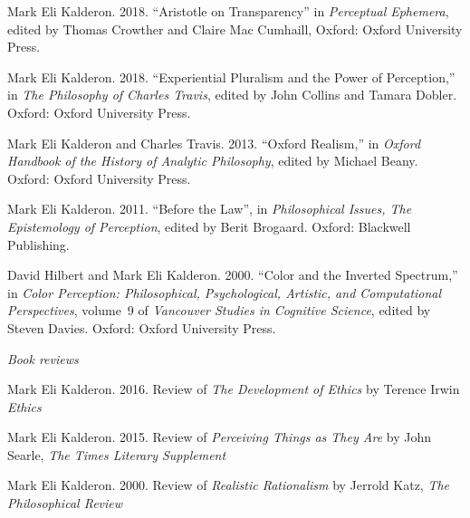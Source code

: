 \documentclass[11pt]{article}
\begin{document}
\ind Mark Eli Kalderon. 2018. ``Aristotle on Transparency'' in \emph{Perceptual Ephemera}, edited by Thomas Crowther and Claire Mac Cumhaill, Oxford: Oxford University Press. 

\ind Mark Eli Kalderon. 2018. ``Experiential Pluralism and the Power of Perception,'' in \emph{The Philosophy of Charles Travis}, edited by John Collins and Tamara Dobler. Oxford: Oxford University Press. 

\ind Mark Eli Kalderon and Charles Travis. 2013. ``Oxford Realism,''  in \emph{Oxford Handbook of the History of Analytic Philosophy}, edited by Michael Beany. Oxford: Oxford University Press.

\ind Mark Eli Kalderon. 2011. ``Before the Law'', in \emph{Philosophical Issues, The Epistemology of Perception}, edited by Berit Brogaard. Oxford: Blackwell Publishing.

\ind David Hilbert and Mark Eli Kalderon. 2000. ``Color and the Inverted Spectrum,'' in \emph{Color Perception: Philosophical, Psychological, Artistic, and Computational Perspectives}, volume~9 of \emph{Vancouver Studies in Cognitive Science}, edited by Steven Davies. Oxford: Oxford University Press.



\bigskip


\noindent\emph{Book reviews \vspace{0.05in}}

\ind Mark Eli Kalderon. 2016. Review of \emph{The Development of Ethics} by Terence Irwin \emph{Ethics}

\ind Mark Eli Kalderon. 2015. Review of \emph{Perceiving Things as They Are} by John Searle, \emph{The Times Literary Supplement}

\ind Mark Eli Kalderon. 2000. Review of \emph{Realistic Rationalism} by Jerrold Katz, \emph{The Philosophical Review}




 


\end{document}
